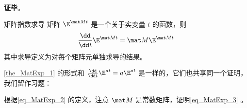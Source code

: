 \textbf{证毕}。





\begin{theorem}{矩阵指数求导}\label{the_MatExp_1}
矩阵 $\E^{\mat Mt}$ 是一个关于实变量 $t$ 的函数，则
\begin{equation}\label{eq_MatExp_3}
\frac{\dd}{\dd t}\E^{\mat Mt}=\mat M\E^{\mat Mt}
\end{equation}
其中求导定义为对每个矩阵元单独求导的结果。
\end{theorem}

\autoref{the_MatExp_1} 的形式和 $\frac{\dd}{\dd t}\E^{at}=a\E^{at}$ 是一样的，它们也共享同一个证明，我们留作习题：

\begin{exercise}{}
根据\autoref{eq_MatExp_2} 的定义，注意 $\mat M$ 是常数矩阵，证明\autoref{eq_MatExp_3} 。
\end{exercise}








